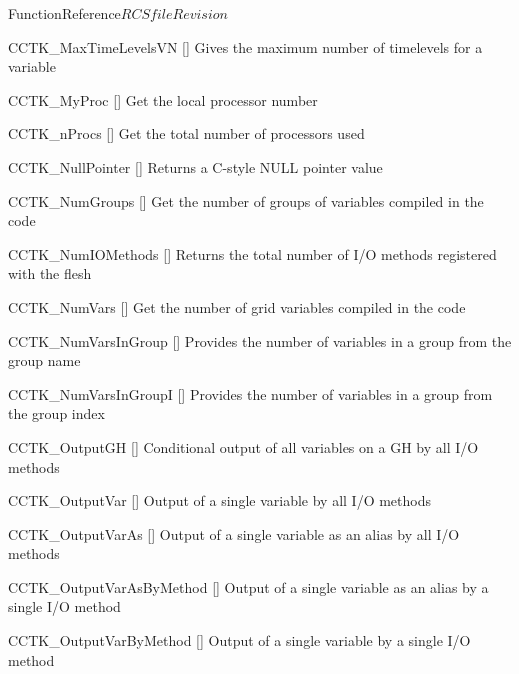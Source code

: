 \begin{cactuspart}{FunctionReference}{$RCSfile$}{$Revision$}
\begin{Lentry}
\item[CCTK\_MaxTimeLevelsVN]
  [\pageref{CCTK-MaxTimeLevelsVN}]
  Gives the maximum number of timelevels for a variable

\item[CCTK\_MyProc]
  [\pageref{CCTK-MyProc}]
  Get the local processor number

\item[CCTK\_nProcs]
  [\pageref{CCTK-nProcs}]
  Get the total number of processors used

\item[CCTK\_NullPointer]
  [\pageref{CCTK-NullPointer}]
  Returns a C-style NULL pointer value

\item[CCTK\_NumGroups]
  [\pageref{CCTK-NumGroups}]
  Get the number of groups of variables compiled in the code

\item[CCTK\_NumIOMethods]
  [\pageref{CCTK-NumIOMethods}]
  Returns the total number of I/O methods registered with the flesh

\item[CCTK\_NumVars]
  [\pageref{CCTK-NumVars}]
  Get the number of grid variables compiled in the code

\item[CCTK\_NumVarsInGroup]
  [\pageref{CCTK-NumVarsInGroup}]
  Provides the number of variables in a group from the group name

\item[CCTK\_NumVarsInGroupI]
  [\pageref{CCTK-NumVarsInGroupI}]
  Provides the number of variables in a group from the group index

\item[CCTK\_OutputGH]
  [\pageref{CCTK-OutputGH}]
  Conditional output of all variables on a GH by all I/O methods

\item[CCTK\_OutputVar]
  [\pageref{CCTK-OutputVar}]
  Output of a single variable by all I/O methods

\item[CCTK\_OutputVarAs]
  [\pageref{CCTK-OutputVarAs}]
  Output of a single variable as an alias by all I/O methods

\item[CCTK\_OutputVarAsByMethod]
  [\pageref{CCTK-OutputVarAsByMethod}]
  Output of a single variable as an alias by a single I/O method

\item[CCTK\_OutputVarByMethod]
  [\pageref{CCTK-OutputVarByMethod}]
  Output of a single variable by a single I/O method


\end{Lentry}
\end{cactuspart}
